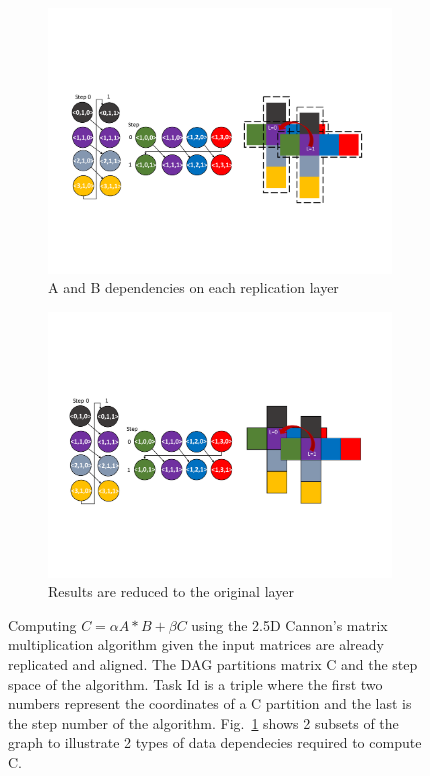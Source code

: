 \begin{figure}[htb]
\centering
\begin{subfigure}[b]{0.4\textwidth}
\includegraphics[width=\textwidth]{figures/cannon0.pdf}
\caption{A and B dependencies on each replication layer}
\label{deps}
\end{subfigure}
\begin{subfigure}[b]{0.4\textwidth}
\includegraphics[width=\textwidth]{figures/cannon1.pdf}
\caption{Results are reduced to the original layer}
\label{dataspace}
\end{subfigure}
\caption{Computing $C= \alpha A * B + \beta C$ using the 2.5D Cannon's matrix multiplication algorithm given the input matrices are already replicated and aligned. 
The DAG partitions matrix C and the step space of the algorithm.
Task Id is a triple where the first two numbers represent the coordinates of a C partition and the last is the step number of the algorithm. 
Fig.~\ref{deps} shows 2 subsets of the graph to illustrate 2 types of data dependecies required to compute C.}
\label{fig:25DCannon}
\end{figure}


